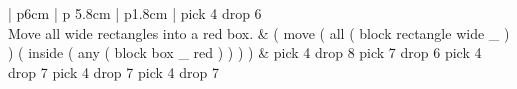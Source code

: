 \begin{table}[p]
\begin{tabular}{| p{6cm} | p {5.8cm} | p{1.8cm} | }
pick 4\linebreak
drop \hfill 6 \\ \hline
Move all wide rectangles into a red box. & ( move ( all ( block rectangle wide \_ ) ) ( inside ( any ( block box \_ red ) ) ) ) & 
pick 4\linebreak
drop 8\linebreak
pick 7\linebreak
drop 6\linebreak
pick 4\linebreak
drop 7\linebreak
pick 4\linebreak
drop 7\linebreak
pick 4\linebreak
drop \hfill 7 \\ \hline
\end{tabular}
\caption{Result of the given example sentences in the initial world}
\label{tab:exampleinput}
\end{table}
